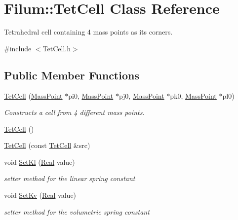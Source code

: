 \hypertarget{class_filum_1_1_tet_cell}{\section{Filum\-:\-:Tet\-Cell Class Reference}
\label{class_filum_1_1_tet_cell}
}


Tetrahedral cell containing 4 mass points as its corners.  




{\ttfamily \#include $<$Tet\-Cell.\-h$>$}

\subsection*{Public Member Functions}
\begin{DoxyCompactItemize}
\item 
\hyperlink{class_filum_1_1_tet_cell_a039a4df8d627ea226beacc632985a127}{Tet\-Cell} (\hyperlink{class_filum_1_1_mass_point}{Mass\-Point} $\ast$pi0, \hyperlink{class_filum_1_1_mass_point}{Mass\-Point} $\ast$pj0, \hyperlink{class_filum_1_1_mass_point}{Mass\-Point} $\ast$pk0, \hyperlink{class_filum_1_1_mass_point}{Mass\-Point} $\ast$pl0)
\begin{DoxyCompactList}\small\item\em Constructs a cell from 4 different mass points. \end{DoxyCompactList}\item 
\hyperlink{class_filum_1_1_tet_cell_a8d9ac7407b16a5c10529e89489b62319}{Tet\-Cell} ()
\item 
\hyperlink{class_filum_1_1_tet_cell_a5870a4afa69a7cbc88e3ac533aafef04}{Tet\-Cell} (const \hyperlink{class_filum_1_1_tet_cell}{Tet\-Cell} \&src)
\item 
void \hyperlink{class_filum_1_1_tet_cell_a8bdd035279e4b0cb08389b5c71d10a6c}{Set\-Kl} (\hyperlink{stdafx_8h_a445a5f0e2a34c9d97d69a3c2d1957907}{Real} value)
\begin{DoxyCompactList}\small\item\em setter method for the linear spring constant \end{DoxyCompactList}\item 
void \hyperlink{class_filum_1_1_tet_cell_ab1d3bbaab312c27d9dbc165cab84d17a}{Set\-Kv} (\hyperlink{stdafx_8h_a445a5f0e2a34c9d97d69a3c2d1957907}{Real} value)
\begin{DoxyCompactList}\small\item\em setter method for the volumetric spring constant \end{DoxyCompactList}\item 

\end{DoxyCompactItemize}
